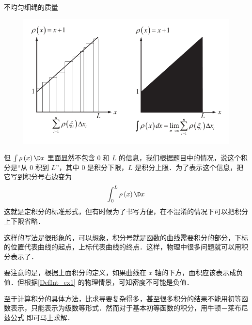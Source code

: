 \begin{exam}{不均匀细绳的质量}
\begin{figure}[ht]
\centering
\includegraphics[width=12cm]{./figures/Defint2.pdf}
\end{figure}

但 $\int {\rho \left( x \right)\D x} $ 里面显然不包含 $0$ 和 $L$ 的信息，我们根据题目中的情况，说这个积分是“从 $0$ 积到 $L$”，其中 $0$ 是积分下限，$L$ 是积分上限．为了表示这个信息，把它写到积分号右边变为
\begin{equation}
\int_0^L {\rho \left( x \right)\D x} 
\end{equation}
这就是定积分的标准形式，但有时候为了书写方便，在不混淆的情况下可以把积分上下限省略．
\end{exam}

这样的写法是很形象的，可以想象，积分号就是函数的曲线需要积分的部分，下标的位置代表曲线的起点，上标代表曲线的终点．这样，物理中很多问题就可以用积分表示了．

要注意的是，根据上面积分的定义，如果曲线在 $x$ 轴的下方，面积应该表示成负值．但根据\autoref{DefInt_ex1} 的物理情景，可知密度不可能是负值．

至于计算积分的具体方法，比求导要复杂得多，甚至很多积分的结果不能用初等函数表示，只能表示为级数等形式．然而对于基本初等函数的积分，用牛顿－莱布尼兹公式 即可马上求解．

